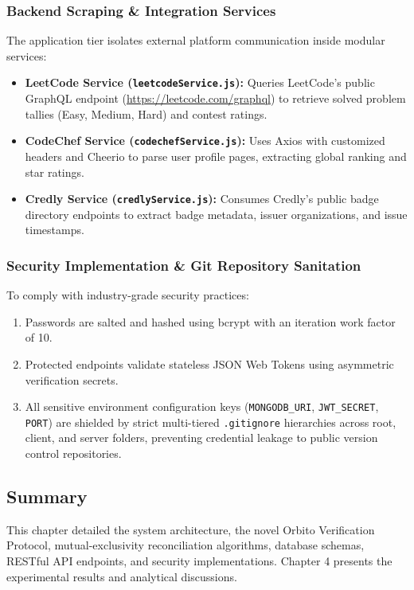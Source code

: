 \documentclass[12pt,a4paper]{article}
\begin{document}
\subsubsection{Backend Scraping \& Integration Services}
The application tier isolates external platform communication inside modular services:
\begin{itemize}[leftmargin=*]
    \item \textbf{LeetCode Service (\texttt{leetcodeService.js}):} Queries LeetCode's public GraphQL endpoint (\url{https://leetcode.com/graphql}) to retrieve solved problem tallies (Easy, Medium, Hard) and contest ratings.
    \item \textbf{CodeChef Service (\texttt{codechefService.js}):} Uses Axios with customized headers and Cheerio to parse user profile pages, extracting global ranking and star ratings.
    \item \textbf{Credly Service (\texttt{credlyService.js}):} Consumes Credly's public badge directory endpoints to extract badge metadata, issuer organizations, and issue timestamps.
\end{itemize}

\subsubsection{Security Implementation \& Git Repository Sanitation}
To comply with industry-grade security practices:
\begin{enumerate}[leftmargin=*]
    \item Passwords are salted and hashed using bcrypt with an iteration work factor of 10.
    \item Protected endpoints validate stateless JSON Web Tokens using asymmetric verification secrets.
    \item All sensitive environment configuration keys (\texttt{MONGODB\_URI}, \texttt{JWT\_SECRET}, \texttt{PORT}) are shielded by strict multi-tiered \texttt{.gitignore} hierarchies across root, client, and server folders, preventing credential leakage to public version control repositories.
\end{enumerate}

\subsection{Summary}
This chapter detailed the system architecture, the novel Orbito Verification Protocol, mutual-exclusivity reconciliation algorithms, database schemas, RESTful API endpoints, and security implementations. Chapter 4 presents the experimental results and analytical discussions.
\end{document}
